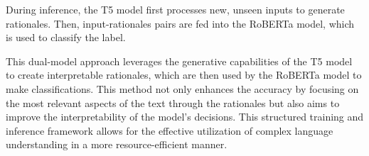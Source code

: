 During inference, the T5 model first processes new, unseen inputs to generate rationales. Then, input-rationales pairs are fed into the RoBERTa model, which is used to classify the label.

This dual-model approach leverages the generative capabilities of the T5 model to create interpretable rationales, which are then used by the RoBERTa model to make classifications. This method not only enhances the accuracy by focusing on the most relevant aspects of the text through the rationales but also aims to improve the interpretability of the model's decisions. This structured training and inference framework allows for the effective utilization of complex language understanding in a more resource-efficient manner.
